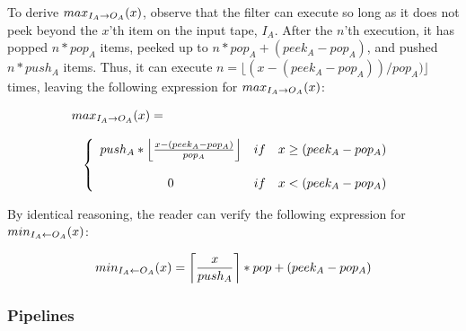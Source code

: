 To derive $max_{I_A \rightarrow O_A}(x)$, observe that the filter can execute so
long as it does not peek beyond the $x$'th item on the input tape,
$I_A$.  After the $n$'th execution, it has popped $n*pop_A$ items,
peeked up to $n*pop_A + (peek_A - pop_A)$, and pushed $n*push_A$
items.  Thus, it can execute $n = \lfloor(x - (peek_A - pop_A)) /
pop_A)\rfloor$ times, leaving the following expression for
$max_{I_A \rightarrow O_A}(x)$:

\[
\begin{array}{l}
\ma{I_A}{O_A}(x) = \\ \\
\makebox[.1in]{ } \left\{
\begin{array}{ccl}
push_A*\left\lfloor\frac{x-(peek_A-pop_A)}{pop_A}\right\rfloor & if & x \ge (peek_A-pop_A) \\
 & \\
0 & if & x < (peek_A-pop_A) \\
\end{array} \right.
\end{array}
\]

By identical reasoning, the reader can verify the following
expression for $min_{I_A \leftarrow O_A}(x)$:

\begin{align*}
min_{I_A \leftarrow O_A}(x) = \left\lceil\frac{x}{push_A}\right\rceil*pop+(peek_A-pop_A)
\end{align*}

\subsubsection{Pipelines}

